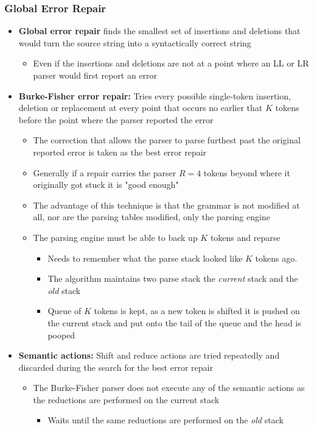 \documentclass[11pt]{article}
\begin{document}
\subsubsection{Global Error Repair}
\label{sec:orgf7888c5}
\begin{itemize}
\item \textbf{Global error repair} finds the smallest set of insertions and deletions that would turn the source string into a syntactically correct string
\begin{itemize}
\item Even if the insertions and deletions are not at a point where an LL or LR parser would first report an error
\end{itemize}

\item \textbf{Burke-Fisher error repair:} Tries every possible single-token insertion, deletion or replacement at every point that occurs no earlier that \(K\) tokens before the point where the parser reported the error
\begin{itemize}
\item The correction that allows the parser to parse furthest past the original reported error is taken as the best error repair
\item Generally if a repair carries the parser \(R=4\) tokens beyond where it originally got stuck it is "good enough"
\item The advantage of this technique is that the grammar is not modified at all, nor are the parsing tables modified, only the parsing engine
\item The parsing engine must be able to back up \(K\) tokens and reparse
\begin{itemize}
\item Needs to remember what the parse stack looked like \(K\) tokens ago.
\item The algorithm maintains two parse stack the \emph{current} stack and the \emph{old} stack
\item Queue of \(K\) tokens is kept, as a new token is shifted it is pushed on the current stack and put onto the tail of the queue and the head is pooped
\end{itemize}
\end{itemize}

\item \textbf{Semantic actions:} Shift and reduce actions are tried repeatedly and discarded during the search for the best error repair
\begin{itemize}
\item The Burke-Fisher parser does not execute any of the semantic actions as the reductions are performed on the current stack
\begin{itemize}
\item Waits until the same reductions are performed on the \emph{old} stack
\end{itemize}
\end{itemize}


\end{itemize}
\end{document}
